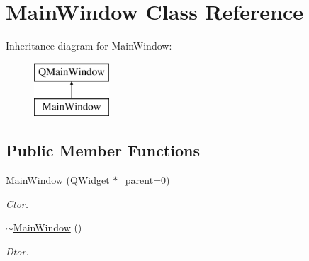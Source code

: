 \hypertarget{class_main_window}{}\section{Main\+Window Class Reference}
\label{class_main_window}
Inheritance diagram for Main\+Window\+:\begin{figure}[H]
\begin{center}
\leavevmode
\includegraphics[height=2.000000cm]{class_main_window}
\end{center}
\end{figure}
\subsection*{Public Member Functions}
\begin{DoxyCompactItemize}
\item 
\hyperlink{class_main_window_a93cfdcac35db98baf6a7d2c2738a2006}{Main\+Window} (Q\+Widget $\ast$\+\_\+parent=0)\hypertarget{class_main_window_a93cfdcac35db98baf6a7d2c2738a2006}{}\label{class_main_window_a93cfdcac35db98baf6a7d2c2738a2006}

\begin{DoxyCompactList}\small\item\em Ctor. \end{DoxyCompactList}\item 
\hyperlink{class_main_window_ae98d00a93bc118200eeef9f9bba1dba7}{$\sim$\+Main\+Window} ()\hypertarget{class_main_window_ae98d00a93bc118200eeef9f9bba1dba7}{}\label{class_main_window_ae98d00a93bc118200eeef9f9bba1dba7}

\begin{DoxyCompactList}\small\item\em Dtor. \end{DoxyCompactList}\end{DoxyCompactItemize}
